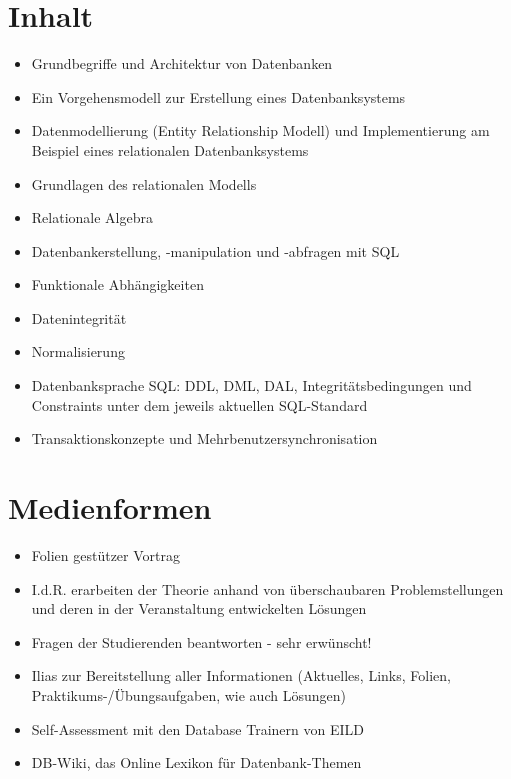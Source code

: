 \hypertarget{inhaltpathlabelmi-2017modulbeschreibungen-bachelorba_datenbanken1}{%
\section*{Inhalt\label{/mi-2017/modulbeschreibungen-bachelor/BA_Datenbanken1}}\label{inhaltpathlabelmi-2017modulbeschreibungen-bachelorba_datenbanken1}}

\begin{itemize}
\tightlist
\item
  Grundbegriffe und Architektur von Datenbanken
\item
  Ein Vorgehensmodell zur Erstellung eines Datenbanksystems
\item
  Datenmodellierung (Entity Relationship Modell) und Implementierung am
  Beispiel eines relationalen Datenbanksystems
\item
  Grundlagen des relationalen Modells
\item
  Relationale Algebra
\item
  Datenbankerstellung, -manipulation und -abfragen mit SQL
\item
  Funktionale Abhängigkeiten
\item
  Datenintegrität
\item
  Normalisierung
\item
  Datenbanksprache SQL: DDL, DML, DAL, Integritätsbedingungen und
  Constraints unter dem jeweils aktuellen SQL-Standard
\item
  Transaktionskonzepte und Mehrbenutzersynchronisation
\end{itemize}

\hypertarget{medienformenpathlabelmi-2017modulbeschreibungen-bachelorba_datenbanken1}{%
\section*{Medienformen\label{/mi-2017/modulbeschreibungen-bachelor/BA_Datenbanken1}}\label{medienformenpathlabelmi-2017modulbeschreibungen-bachelorba_datenbanken1}}

\begin{itemize}
\tightlist
\item
  Folien gestützer Vortrag
\item
  I.d.R. erarbeiten der Theorie anhand von überschaubaren
  Problemstellungen und deren in der Veranstaltung entwickelten Lösungen
\item
  Fragen der Studierenden beantworten - sehr erwünscht!
\item
  Ilias zur Bereitstellung aller Informationen (Aktuelles, Links,
  Folien, Praktikums-/Übungsaufgaben, wie auch Lösungen)
\item
  Self-Assessment mit den Database Trainern von EILD
\item
  DB-Wiki, das Online Lexikon für Datenbank-Themen
\end{itemize}

